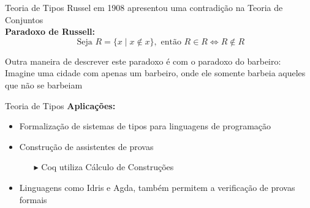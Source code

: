 \begin{frame}{Teoria de Tipos}
    Russel em 1908 apresentou uma contradição na Teoria de Conjuntos\\
    \textbf{Paradoxo de Russell:}
    \begin{equation}
        \text{ Seja } R = \{ x \mid x \notin x \}, \text{ então } R \in R \iff R \notin R\nonumber
    \end{equation}

    Outra maneira de descrever este paradoxo é com o paradoxo do barbeiro:\\
    \qquad{}\qquad{}Imagine uma cidade com apenas um barbeiro, onde ele somente barbeia aqueles que não se barbeiam
\end{frame}

\begin{frame}{Teoria de Tipos}
    \textbf{Aplicações:}\\
    \begin{itemize}
        \item Formalização de sistemas de tipos para linguagens de programação
        \item Construção de assistentes de provas
              \begin{itemize}
                  \item[$\blacktriangleright$] Coq utiliza Cálculo de Construções~\cite{COQUAND1998}
              \end{itemize}
        \item Linguagens como Idris e Agda, também permitem a verificação de provas formais
    \end{itemize}
\end{frame}

